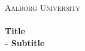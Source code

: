 \begin{titlingpage}\centering



\textsc{\LARGE Aalborg University}\\[0.3cm]

\HRule \\[0.4cm]
{\huge \bfseries Title}\\[0.5cm]
{\Large \bfseries - Subtitle}

\HRule \\[2cm]


\end{titlingpage}
